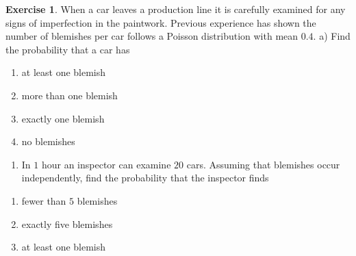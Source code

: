 \documentclass[
]{book}
\providecommand{\tightlist}{%
  \setlength{\itemsep}{0pt}\setlength{\parskip}{0pt}}
\theoremstyle{definition}
\theoremstyle{definition}
\theoremstyle{definition}
\newtheorem{exercise}{Exercise}[chapter]
\theoremstyle{definition}
\theoremstyle{remark}
\begin{document}
\begin{exercise}

When a car leaves a production line it is carefully examined for any signs of imperfection in the paintwork. Previous experience has shown the number of blemishes per car follows a Poisson distribution with mean \(0.4\).
a) Find the probability that a car has

\begin{enumerate}
\def\labelenumi{(\roman{enumi})}
\item
  at least one blemish
\item
  more than one blemish
\item
  exactly one blemish
\item
  no blemishes
\end{enumerate}

\begin{enumerate}
\def\labelenumi{\alph{enumi})}
\setcounter{enumi}{1}
\tightlist
\item
  In \(1\) hour an inspector can examine \(20\) cars. Assuming that blemishes occur independently, find the probability that the inspector finds
\end{enumerate}

\begin{enumerate}
\def\labelenumi{(\roman{enumi})}
\item
  fewer than \(5\) blemishes
\item
  exactly five blemishes
\item
  at least one blemish
\end{enumerate}

\end{exercise}
\end{document}

